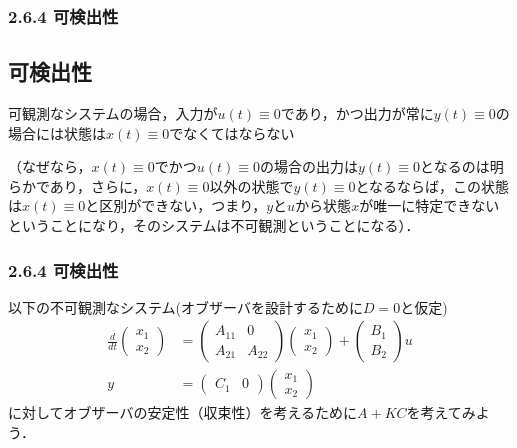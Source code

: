\begin{frame}[t]
\frametitle{2.6.4 可検出性}
\subsection{可検出性}

可観測なシステムの場合，入力が$u(t) \equiv 0$であり，かつ出力が常に$y(t)\equiv 0$の場合には状態は$x(t) \equiv 0$でなくてはならない

（なぜなら，$x(t) \equiv 0$でかつ$u(t) \equiv 0$の場合の出力は$y(t) \equiv 0$となるのは明らかであり，さらに，$x(t) \equiv 0$以外の状態で$y(t) \equiv 0$となるならば，この状態は$x(t)\equiv 0$と区別ができない，つまり，$y$と$u$から状態$x$が唯一に特定できないということになり，そのシステムは不可観測ということになる）．

\end{frame}

\begin{frame}[t]
\frametitle{2.6.4 可検出性}
以下の不可観測なシステム(オブザーバを設計するために$D=0$と仮定)
\begin{align}
 \frac{d}{dt}
  \left(\begin{array}{c}
         {x}_1 \\
	 {x}_2 
	\end{array}\right)
  &=
  \left(\begin{array}{cc}
         {A}_{11} & 0 \\
	     {A}_{21} & {A}_{22}
	\end{array}\right)
  \left(\begin{array}{c}
         {x}_1 \\
	 {x}_2 
	\end{array}\right)
  +
  \left(\begin{array}{c}
         {B}_1 \\
	 {B}_2
	\end{array}\right)
  u 
 \\
 y &=
  \left(\begin{array}{cc}
         {C}_1 & 0
	\end{array}\right)
  \left(\begin{array}{c}
         {x}_1 \\
	 {x}_2 
	\end{array}\right)
\end{align}
に対してオブザーバの安定性（収束性）を考えるために$A+KC$を考えてみよう．
\end{frame}

